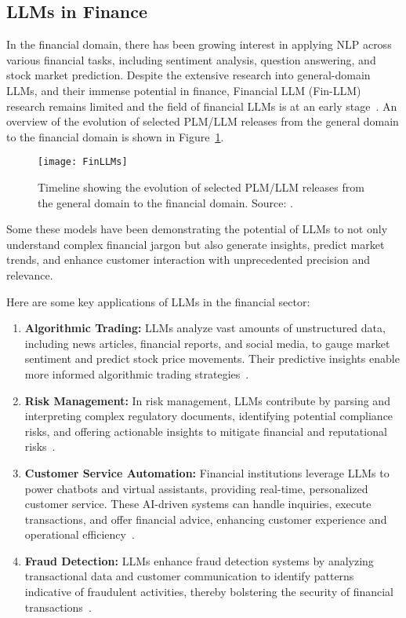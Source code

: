 \subsection{LLMs in Finance}
\label{subsec:llms-in-finance}

In the financial domain, there has been growing interest in applying NLP across various financial tasks, including sentiment analysis, question answering, and stock market prediction.
Despite the extensive research into general-domain LLMs, and their immense potential in finance, Financial LLM (Fin-LLM) research remains limited and the field of financial LLMs is at an early stage~\cite{lee2024survey}.
An overview of the evolution of selected PLM/LLM releases from the general domain to the financial domain is shown in Figure~\ref{fig:llm-finance}.

\begin{figure}[h]
	\centering
	\texttt{[image: FinLLMs]}
	\caption{Timeline showing the evolution of selected PLM/LLM releases from the general domain to the financial domain. Source: \protect\textcite{lee2024survey}.}
	\label{fig:llm-finance}
\end{figure}

Some these models have been demonstrating the potential of LLMs to not only understand complex financial jargon but also generate insights, predict market trends, and enhance customer interaction with unprecedented precision and relevance.

Here are some key applications of LLMs in the financial sector:

\begin{enumerate}
	\item \textbf{Algorithmic Trading:}
	      {LLMs analyze vast amounts of unstructured data, including news articles, financial reports, and social media, to gauge market sentiment and predict stock price movements.
		      Their predictive insights enable more informed algorithmic trading strategies~\cite{buehler2018deep}.}

	\item \textbf{Risk Management:}
	      {In risk management, LLMs contribute by parsing and interpreting complex regulatory documents, identifying potential compliance risks, and offering actionable insights to mitigate financial and reputational risks~\cite{li2020natural}.}

	\item \textbf{Customer Service Automation:}
	      {Financial institutions leverage LLMs to power chatbots and virtual assistants, providing real-time, personalized customer service. These AI-driven systems can handle inquiries, execute transactions, and offer financial advice, enhancing customer experience and operational efficiency~\cite{pal2021enhancing}.}

	\item \textbf{Fraud Detection:}
	      {LLMs enhance fraud detection systems by analyzing transactional data and customer communication to identify patterns indicative of fraudulent activities, thereby bolstering the security of financial transactions~\cite{smith2019improving}.}
\end{enumerate}

